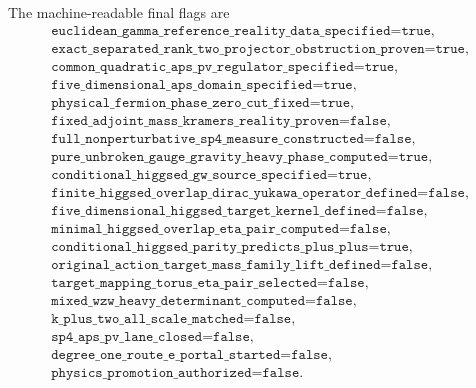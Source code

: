\documentclass[11pt]{article}
\theoremstyle{definition}
\theoremstyle{remark}
\begin{document}
The machine-readable final flags are
\begin{equation}
 \begin{gathered}
 \texttt{euclidean\_gamma\_reference\_reality\_data\_specified=true},\\
 \texttt{exact\_separated\_rank\_two\_projector\_obstruction\_proven=true},\\
 \texttt{common\_quadratic\_aps\_pv\_regulator\_specified=true},\\
 \texttt{five\_dimensional\_aps\_domain\_specified=true},\\
 \texttt{physical\_fermion\_phase\_zero\_cut\_fixed=true},\\
 \texttt{fixed\_adjoint\_mass\_kramers\_reality\_proven=false},\\
 \texttt{full\_nonperturbative\_sp4\_measure\_constructed=false},\\
 \texttt{pure\_unbroken\_gauge\_gravity\_heavy\_phase\_computed=true},\\
 \texttt{conditional\_higgsed\_gw\_source\_specified=true},\\
 \texttt{finite\_higgsed\_overlap\_dirac\_yukawa\_operator\_defined=false},\\
 \texttt{five\_dimensional\_higgsed\_target\_kernel\_defined=false},\\
 \texttt{minimal\_higgsed\_overlap\_eta\_pair\_computed=false},\\
 \texttt{conditional\_higgsed\_parity\_predicts\_plus\_plus=true},\\
 \texttt{original\_action\_target\_mass\_family\_lift\_defined=false},\\
 \texttt{target\_mapping\_torus\_eta\_pair\_selected=false},\\
 \texttt{mixed\_wzw\_heavy\_determinant\_computed=false},\\
 \texttt{k\_plus\_two\_all\_scale\_matched=false},\\
 \texttt{sp4\_aps\_pv\_lane\_closed=false},\\
 \texttt{degree\_one\_route\_e\_portal\_started=false},\\
 \texttt{physics\_promotion\_authorized=false}.
 \end{gathered}
 \label{eq:final-flags}
\end{equation}
\end{document}
